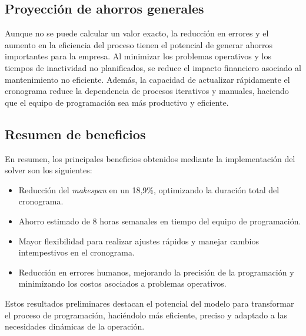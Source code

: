 \documentclass{article}
\begin{document}
\subsection{Proyección de ahorros generales}

Aunque no se puede calcular un valor exacto, la reducción en errores y el aumento en la eficiencia del proceso tienen el potencial de generar ahorros importantes para la empresa. Al minimizar los problemas operativos y los tiempos de inactividad no planificados, se reduce el impacto financiero asociado al mantenimiento no eficiente. Además, la capacidad de actualizar rápidamente el cronograma reduce la dependencia de procesos iterativos y manuales, haciendo que el equipo de programación sea más productivo y eficiente.

\subsection{Resumen de beneficios}

En resumen, los principales beneficios obtenidos mediante la implementación del solver son los siguientes:
\begin{itemize}
    \item Reducción del \textit{makespan} en un 18,9\%, optimizando la duración total del cronograma.
    \item Ahorro estimado de 8 horas semanales en tiempo del equipo de programación.
    \item Mayor flexibilidad para realizar ajustes rápidos y manejar cambios intempestivos en el cronograma.
    \item Reducción en errores humanos, mejorando la precisión de la programación y minimizando los costos asociados a problemas operativos.
\end{itemize}

Estos resultados preliminares destacan el potencial del modelo para transformar el proceso de programación, haciéndolo más eficiente, preciso y adaptado a las necesidades dinámicas de la operación.
\end{document}
